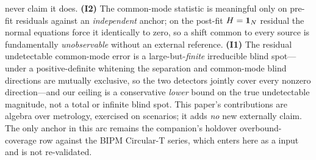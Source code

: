never claim it does. \textbf{(I2)} The common-mode statistic is meaningful only on
pre-fit residuals against an \emph{independent} anchor; on the post-fit $H=\bm 1_N$
residual the normal equations force it identically to zero, so a shift common to
every source is fundamentally \emph{unobservable} without an external reference.
\textbf{(I1)} The residual undetectable common-mode error is a large-but-\emph{finite}
irreducible blind spot---under a positive-definite whitening the separation and
common-mode blind directions are mutually exclusive, so the two detectors jointly
cover every nonzero direction---and our ceiling is a conservative \emph{lower}
bound on the true undetectable magnitude, not a total or infinite blind spot. This
paper's contributions are \Proven{} algebra over \Cited{} metrology, exercised on
\Modelled{} scenarios; it adds \emph{no} new externally \Validated{} claim. The
only \Validated{} anchor in this arc remains the companion's holdover
overbound-coverage row against the BIPM Circular-T series, which enters here as a
\Cited{} input and is not re-validated.

